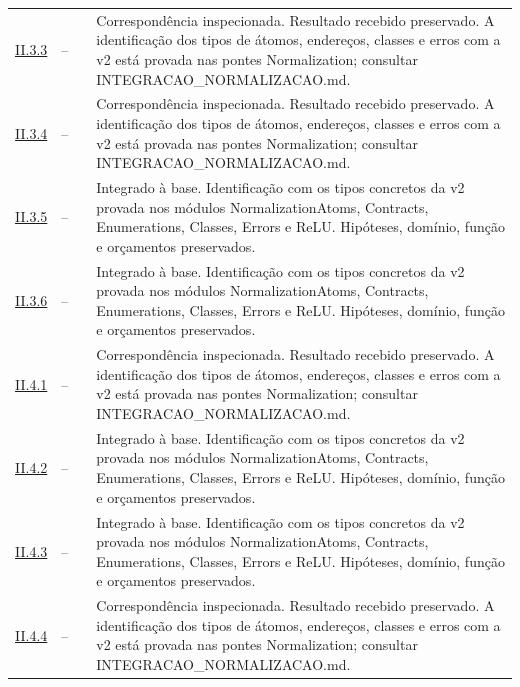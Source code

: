 \begin{longtable}{@{}p{.11\linewidth}p{.09\linewidth}p{.09\linewidth}p{.59\linewidth}@{}}
\hyperref[map:normalizacao:3.3]{II.3.3} & -- & \pageref{map:normalizacao:3.3} & Correspondência inspecionada. Resultado recebido preservado. A identificação dos tipos de átomos, endereços, classes e erros com a v2 está provada nas pontes Normalization; consultar INTEGRACAO\_NORMALIZACAO.md.\\[4pt]
\hyperref[map:normalizacao:3.4]{II.3.4} & -- & \pageref{map:normalizacao:3.4} & Correspondência inspecionada. Resultado recebido preservado. A identificação dos tipos de átomos, endereços, classes e erros com a v2 está provada nas pontes Normalization; consultar INTEGRACAO\_NORMALIZACAO.md.\\[4pt]
\hyperref[map:normalizacao:3.5]{II.3.5} & -- & \pageref{map:normalizacao:3.5} & Integrado à base. Identificação com os tipos concretos da v2 provada nos módulos NormalizationAtoms, Contracts, Enumerations, Classes, Errors e ReLU. Hipóteses, domínio, função e orçamentos preservados.\\[4pt]
\hyperref[map:normalizacao:3.6]{II.3.6} & -- & \pageref{map:normalizacao:3.6} & Integrado à base. Identificação com os tipos concretos da v2 provada nos módulos NormalizationAtoms, Contracts, Enumerations, Classes, Errors e ReLU. Hipóteses, domínio, função e orçamentos preservados.\\[4pt]
\hyperref[map:normalizacao:4.1]{II.4.1} & -- & \pageref{map:normalizacao:4.1} & Correspondência inspecionada. Resultado recebido preservado. A identificação dos tipos de átomos, endereços, classes e erros com a v2 está provada nas pontes Normalization; consultar INTEGRACAO\_NORMALIZACAO.md.\\[4pt]
\hyperref[map:normalizacao:4.2]{II.4.2} & -- & \pageref{map:normalizacao:4.2} & Integrado à base. Identificação com os tipos concretos da v2 provada nos módulos NormalizationAtoms, Contracts, Enumerations, Classes, Errors e ReLU. Hipóteses, domínio, função e orçamentos preservados.\\[4pt]
\hyperref[map:normalizacao:4.3]{II.4.3} & -- & \pageref{map:normalizacao:4.3} & Integrado à base. Identificação com os tipos concretos da v2 provada nos módulos NormalizationAtoms, Contracts, Enumerations, Classes, Errors e ReLU. Hipóteses, domínio, função e orçamentos preservados.\\[4pt]
\hyperref[map:normalizacao:4.4]{II.4.4} & -- & \pageref{map:normalizacao:4.4} & Correspondência inspecionada. Resultado recebido preservado. A identificação dos tipos de átomos, endereços, classes e erros com a v2 está provada nas pontes Normalization; consultar INTEGRACAO\_NORMALIZACAO.md.\\[4pt]

\end{longtable}
